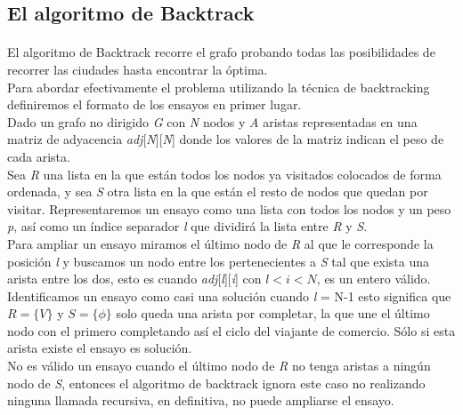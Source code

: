 \documentclass[es]{ifirak}
\begin{document}
\large{
	\subsection{El algoritmo de Backtrack}
	\paragraph{}El algoritmo de Backtrack recorre el grafo probando todas las posibilidades de recorrer las ciudades hasta encontrar la óptima.\\ 
	
	Para abordar efectivamente el problema utilizando la técnica de backtracking definiremos el formato de los ensayos en primer lugar.\\
	
	Dado un grafo no dirigido \textit{G} con \textit{N} nodos y \textit{A} aristas representadas en una matriz de adyacencia \textit{adj}[\textit{N}][\textit{N}] donde los valores de la matriz indican el peso de cada arista.\\
	
	Sea \textit{R} una lista en la que están todos los nodos ya visitados colocados de forma ordenada, y sea \textit{S} otra lista en la que están el resto de nodos que quedan por visitar. Representaremos un ensayo como una lista con todos los nodos y un peso \textit{p}, así como un índice separador \textit{l} que dividirá la lista entre \textit{R} y \textit{S}. \\
	
	Para ampliar un ensayo miramos el último nodo de \textit{R} al que le corresponde la posición \textit{l} y buscamos un nodo entre los pertenecientes a \textit{S} tal que exista una arista entre los dos, esto es cuando \textit{adj}[\textit{l}][\textit{i}] con $l<i<N$, es un entero válido.\\
	
	Identificamos un ensayo como casi una solución cuando \textit{l} = N-1 esto significa que $R = \{V\}$ y $S=\{\phi\}$ solo queda una arista por completar, la que une el último nodo con el primero completando así el ciclo del viajante de comercio. Sólo si esta arista existe el ensayo es solución.\\ 
	
	No es válido un ensayo cuando el último nodo de \textit{R} no tenga aristas a ningún nodo de \textit{S}, entonces el algoritmo de backtrack ignora este caso no realizando ninguna llamada recursiva, en definitiva, no puede ampliarse el ensayo.\\
	\vspace*{1.5cm}
	\pagebreak
	
}
\end{document}
